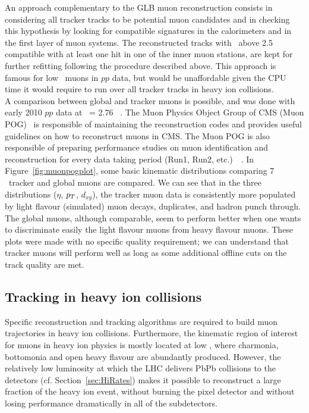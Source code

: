 An approach complementary to the GLB muon reconstruction consists
in considering all tracker tracks to be potential muon candidates and
in checking this hypothesis by looking for compatible signatures in
the calorimeters and in the first layer of muon systems. The reconstructed tracks
with \pt\ above 2.5 \GeVc compatible with at least one hit
in one of the inner muon stations, are kept for further refitting
following the procedure described above. This approach is famous for
low \pt\ muons in $pp$ data, but would be unaffordable given the CPU
time it would require to run over all tracker tracks in heavy ion collisions.
\\
A comparison between global and tracker muons is possible, and was
done with early 2010 $pp$ data at \s\ = 2.76 \TeV~\cite{muo}. The Muon
Physics Object Group of CMS (Muon POG)~\cite{muonpog} is responsible of maintaining
the reconstruction codes and provides useful guidelines on how to
reconstruct muons in CMS. The Muon POG is also responsible of
preparing performance studies on muon identification and
reconstruction for every data taking period (Run1,
Run2, etc.)~\cite{Chatrchyan:2013sba}~\cite{CMS-PAS-MUO-10-002}. In
Figure~\ref{fig:muonpogplot}, some basic kinematic distributions comparing
7 \TeV\ tracker and global muons are compared. We can see that in the
three distributions ($\eta$, $p_{T}$, $d_{xy}$), the tracker muon
data is consistently more populated by light flavour (simulated) muon
decays, duplicates, and hadron punch through. The global muons,
although comparable, seem to perform better when one wants to
discriminate easily the light flavour muons from heavy flavour
muons. These plots were made with no specific quality requirement; we
can understand that tracker muons will perform well as long as some
additional offline cuts on the track quality are met. 


\subsection{Tracking in heavy ion collisions}
\label{sec:hireco}
Specific
reconstruction and tracking algorithms are required to build muon
trajectories in heavy ion collisions. Furthermore, the kinematic
region of interest for muons in heavy ion physics is mostly located at
low \pt, where charmonia, bottomonia and open heavy flavour are
abundantly produced. However, the relatively low luminosity at which the
LHC delivers PbPb collisions to the detectors (cf. Section~\ref{sec:HiRates}) makes it possible to
reconstruct a large fraction of the heavy ion event, without burning
the pixel detector and without losing performance dramatically in all
of the subdetectors.


